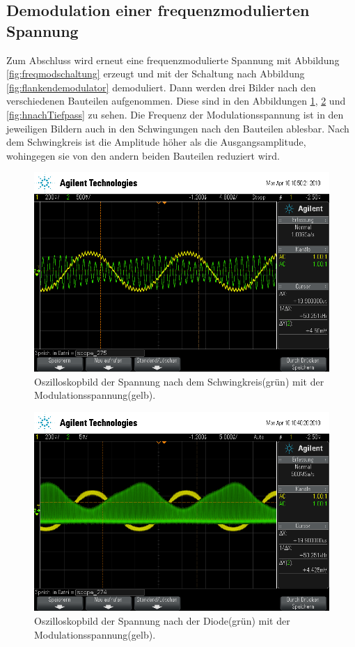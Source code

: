 \subsection{Demodulation einer frequenzmodulierten Spannung}

Zum Abschluss wird erneut eine frequenzmodulierte Spannung mit Abbildung \ref{fig:freqmodschaltung} erzeugt und mit der Schaltung nach Abbildung \ref{fig:flankendemodulator} demoduliert. Dann werden drei Bilder nach den verschiedenen Bauteilen aufgenommen.
Diese sind in den Abbildungen \ref{fig:hnachSchwingkreis}, \ref{fig:hnachDiode} und \ref{fig:hnachTiefpass} zu sehen.
Die Frequenz der Modulationsspannung ist in den jeweiligen Bildern auch in den Schwingungen nach den Bauteilen ablesbar. Nach dem Schwingkreis ist die Amplitude höher als die Ausgangsamplitude, wohingegen sie von den andern beiden Bauteilen reduziert wird.
\begin{figure}[h]
  \centering
  \includegraphics[width=.9\textwidth]{Oszi_Pics/hnachSchwingkreis.png}
  \caption{Oszilloskopbild der Spannung nach dem Schwingkreis(grün) mit der Modulationsspannung(gelb).}
  \label{fig:hnachSchwingkreis}
\end{figure}
\begin{figure}[h]
  \centering
  \includegraphics[width=.9\textwidth]{Oszi_Pics/hnachDiode?.png}
  \caption{Oszilloskopbild der Spannung nach der Diode(grün) mit der Modulationsspannung(gelb).}
  \label{fig:hnachDiode}
\end{figure}
